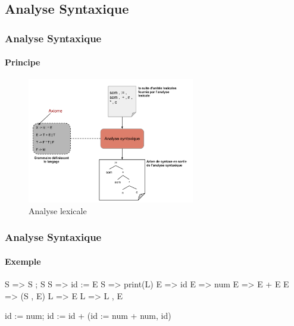 \documentclass{beamer}
\begin{document}
\subsection{Analyse Syntaxique}

\begin{frame}\frametitle{Analyse Syntaxique}\framesubtitle{Principe}

	\begin{figure}[h]
		\centering
			\includegraphics[width=0.65\textwidth]{AnalyseSyntaxique.png}
		\caption{Analyse lexicale}
		\label{fig:AnalyseLexicale}
	\end{figure}\FloatBarrier

\end{frame}

\begin{frame}\frametitle{Analyse Syntaxique}\framesubtitle{Exemple}

	S => S ; S\newline
	S => id := E\newline
	S => print(L)\newline
	E => id\newline
	E => num\newline
	E => E + E\newline
	E => (S , E)\newline
	L => E\newline
	L => L , E\newline\newline

	id := num; id := id + (id := num + num, id)

\end{frame}
\end{document}
